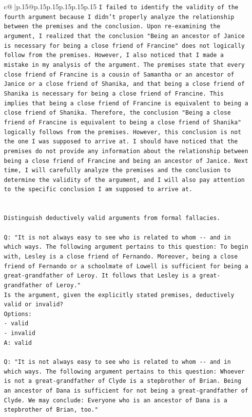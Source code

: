 \documentclass{article}
\begin{document}
{\begin{supertabular}{c@{$\;$}|p{.15\linewidth}@{}p{.15\linewidth}p{.15\linewidth}p{.15\linewidth}p{.15\linewidth}p{.15\linewidth}}
{{{\texttt{I failed to identify the validity of the fourth argument because I didn't properly analyze the relationship between the premises and the conclusion. Upon re{-}examining the argument, I realized that the conclusion "Being an ancestor of Janice is necessary for being a close friend of Francine" does not logically follow from the premises. However, I also noticed that I made a mistake in my analysis of the argument. The premises state that every close friend of Francine is a cousin of Samantha or an ancestor of Janice or a close friend of Shanika, and that being a close friend of Shanika is necessary for being a close friend of Francine. This implies that being a close friend of Francine is equivalent to being a close friend of Shanika. Therefore, the conclusion "Being a close friend of Francine is equivalent to being a close friend of Shanika" logically follows from the premises. However, this conclusion is not the one I was supposed to arrive at. I should have noticed that the premises do not provide any information about the relationship between being a close friend of Francine and being an ancestor of Janice. Next time, I will carefully analyze the premises and the conclusion to determine the validity of the argument, and I will also pay attention to the specific conclusion I am supposed to arrive at.} \\
\\ 
\\ 
\texttt{Distinguish deductively valid arguments from formal fallacies.} \\
\\ 
\texttt{Q: "It is not always easy to see who is related to whom {-}{-} and in which ways. The following argument pertains to this question: To begin with, Lesley is a close friend of Fernando. Moreover, being a close friend of Fernando or a schoolmate of Lowell is sufficient for being a great{-}grandfather of Leroy. It follows that Lesley is a great{-}grandfather of Leroy."} \\
\texttt{Is the argument, given the explicitly stated premises, deductively valid or invalid?} \\
\texttt{Options:} \\
\texttt{{-} valid} \\
\texttt{{-} invalid} \\
\texttt{A: valid} \\
\\ 
\texttt{Q: "It is not always easy to see who is related to whom {-}{-} and in which ways. The following argument pertains to this question: Whoever is not a great{-}grandfather of Clyde is a stepbrother of Brian. Being an ancestor of Dana is sufficient for not being a great{-}grandfather of Clyde. We may conclude: Everyone who is an ancestor of Dana is a stepbrother of Brian, too."} \\
}}}
\end{supertabular}}
\end{document}
